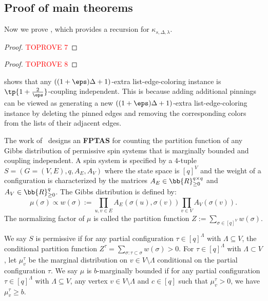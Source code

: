 \documentclass[a4paper,11pt]{article}
\begin{document}
\subsection{Proof of main theorems}\label{sec:CI-proof}

Now we prove , which provides a recursion for $\kappa_{s,\Delta,\lambda}$.

\begin{proof}\textcolor{red}{TOPROVE 7}\end{proof}

\begin{proof}\textcolor{red}{TOPROVE 8}\end{proof}

 shows that any $((1+\eps)\Delta+1)$-extra list-edge-coloring instance is $\tp{1+ \frac{2}{\eps}}$-coupling independent. This is because adding additional pinnings can be viewed as generating a new $((1+\eps)\Delta+1)$-extra list-edge-coloring instance by deleting the pinned edges and removing the corresponding colors from the lists of their adjacent edges. 

The work of~\cite{CFGZZ24} designs an \textbf{FPTAS} for counting the partition function of any Gibbs distribution of permissive spin systems that is marginally bounded and coupling independent. A spin system is specified by a $4$-tuple $S=(G = (V,E),q, A_E, A_V)$ where the state space is $[q]^V$ and the weight of a configuration is characterized by the matrices $A_E \in \bb{R}_{\geq 0}^{q\times q}$ and $A_V \in \bb{R}_{\geq 0}^q$. The Gibbs distribution is defined by:
\[
\mu(\sigma)\propto w(\sigma):=\prod_{u,v\in E} A_E(\sigma(u),\sigma(v))\prod_{v\in V} A_V(\sigma(v)).
\]
The normalizing factor of $\mu$ is called the partition function $Z:=\sum_{\sigma\in [q]^V}w(\sigma)$.

We say $S$ is permissive if for any partial configuration $\tau \in [q]^\Lambda$ with $\Lambda \subseteq V$, the conditional partition function $Z^\tau = \sum_{\sigma:\tau\subset \sigma} w(\sigma) >0$. For $\tau\in [q]^\Lambda$ with $\Lambda \subset V$, let $\mu_v^\tau$ be the marginal distribution on $v\in V\setminus \Lambda$ conditional on the partial configuration $\tau$. We say $\mu$ is $b$-marginally bounded if for any partial configuration $\tau \in [q]^\Lambda$ with $\Lambda \subseteq V$, any vertex $v \in V\setminus \Lambda$ and $c\in [q]$ such that $\mu_v^\tau>0$, we have $\mu_v^\tau\geq b$.
\end{document}
